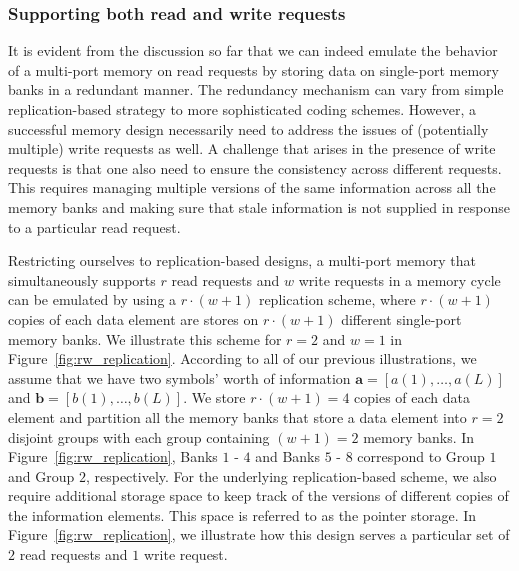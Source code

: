 \subsubsection{Supporting both read and write requests}
\label{sec:rw}
It is evident from the discussion so far that we can indeed emulate the behavior of a multi-port memory on read requests by storing data on single-port memory banks in a redundant manner. The redundancy mechanism can vary from simple replication-based strategy to more sophisticated coding schemes. However, a successful memory design necessarily need to address the issues of (potentially multiple) write requests as well. A challenge that arises in the presence of write requests is that one also need to ensure the consistency across different requests. This requires managing multiple versions of the same information across all the memory banks and making sure that stale information is not supplied in response to a particular read request. 

Restricting ourselves to replication-based designs, a multi-port memory that simultaneously supports $r$ read requests and $w$ write requests in a memory cycle can be emulated by  using a $r\cdot(w + 1)$ replication scheme, where $r\cdot(w+1)$ copies of each data element are stores on $r\cdot(w + 1)$ different single-port memory banks. We illustrate this scheme for $r = 2$ and $w = 1$ in Figure~\ref{fig:rw_replication}. According to all of our previous illustrations, we assume that we have two symbols' worth of information $\mathbf{a} = [a(1),\ldots, a(L)]$ and $\mathbf{b}  = [b(1),\ldots, b(L)]$. We store $r\cdot(w + 1) = 4$ copies of each data element and partition all the memory banks that store a data element into $r = 2$ disjoint groups with each group containing $(w + 1) = 2$ memory banks. In Figure~\ref{fig:rw_replication}, Banks $1$ - $4$ and Banks $5$ - $8$ correspond to Group $1$ and Group $2$, respectively. For the underlying replication-based scheme, we also require additional storage space to keep track of the versions of different copies of the information elements. This space is referred to as the pointer storage. In Figure~\ref{fig:rw_replication}, we illustrate how this design serves a particular set of $2$ read requests and $1$ write request.\\

